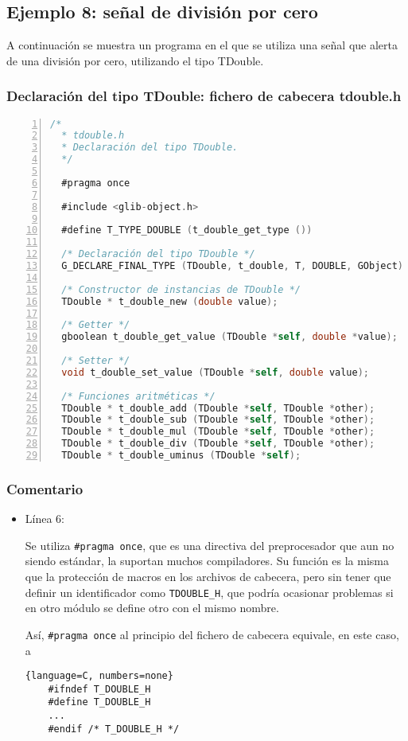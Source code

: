 \subsection{Ejemplo 8: señal de división por cero}
A continuación se muestra un programa en el que se utiliza una señal que alerta de una división por cero, utilizando el tipo \textsf{TDouble}.

\subsubsection{Declaración del tipo \textsf{TDouble}: fichero de cabecera \textsf{tdouble.h}}
\begin{lstlisting}[language=C, numbers=left]
  /*
  * tdouble.h
  * Declaración del tipo TDouble.
  */

  #pragma once

  #include <glib-object.h>

  #define T_TYPE_DOUBLE (t_double_get_type ())

  /* Declaración del tipo TDouble */
  G_DECLARE_FINAL_TYPE (TDouble, t_double, T, DOUBLE, GObject)
  
  /* Constructor de instancias de TDouble */
  TDouble * t_double_new (double value);

  /* Getter */
  gboolean t_double_get_value (TDouble *self, double *value);

  /* Setter */
  void t_double_set_value (TDouble *self, double value);
  
  /* Funciones aritméticas */
  TDouble * t_double_add (TDouble *self, TDouble *other);
  TDouble * t_double_sub (TDouble *self, TDouble *other);
  TDouble * t_double_mul (TDouble *self, TDouble *other);
  TDouble * t_double_div (TDouble *self, TDouble *other);
  TDouble * t_double_uminus (TDouble *self);
\end{lstlisting}

\subsubsection{Comentario}
\begin{itemize}
\item Línea 6:\par
  Se utiliza \texttt{\#pragma once}, que es una directiva del preprocesador que aun no
  siendo estándar, la suportan muchos compiladores. Su función es la misma que la
  protección de macros en los archivos de cabecera, pero sin tener que definir un
  identificador como \texttt{TDOUBLE\_H}, que podría ocasionar problemas si en otro
  módulo se define otro con el mismo nombre.

  Así, \texttt{\#pragma once} al principio del fichero de cabecera equivale, en este
  caso, a 
  \begin{lstlisting}{language=C, numbers=none}
    #ifndef T_DOUBLE_H
    #define T_DOUBLE_H
    ...
    #endif /* T_DOUBLE_H */
  \end{lstlisting}
\end{itemize}

